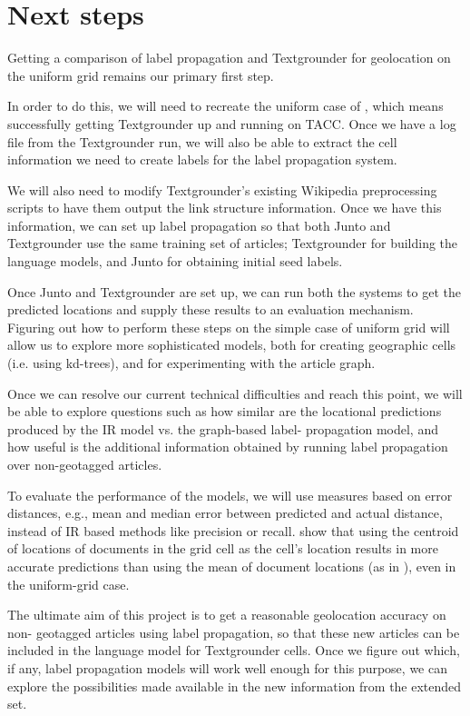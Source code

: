 \section{Next steps} Getting a comparison of label propagation and Textgrounder
for geolocation on the uniform grid remains our primary first step. 

\par In order to do this, we will need to recreate the uniform case of
, which means successfully getting Textgrounder up and
running on TACC. Once we have a log file from the Textgrounder run, we will also
be able to extract the cell information we need to create labels for the label
propagation system.  

\par  We will also need to modify Textgrounder's existing Wikipedia
preprocessing scripts to have them output the link structure information. Once
we have this information, we can set up label propagation so that both Junto
and Textgrounder use the same training set of articles; Textgrounder for
building the language models, and Junto for obtaining initial seed labels.

\par Once Junto and Textgrounder are set up, we can run both the systems to
get the predicted locations and supply these results to an evaluation
mechanism. Figuring out how to perform these steps on the simple case of
uniform grid will allow us to explore more sophisticated models, both for
creating geographic cells (i.e. using kd-trees), and for experimenting with
the article graph. 

\par Once we can resolve our current technical difficulties
and reach this point, we will be able to explore questions such as how similar
are the locational predictions produced by the IR model vs. the graph-based
label- propagation model, and how useful is the additional information
obtained by running label propagation over non-geotagged articles. 

\par To evaluate the performance of the models, we will use measures based on
error distances, e.g., mean and median error between predicted and actual
distance, instead of IR based methods like precision or recall.
 show that using the centroid of locations of documents in
the grid cell as the cell's location results in more accurate predictions than
using the mean of document locations (as in ), even in
the uniform-grid case.

\par The ultimate aim of this project is to get a reasonable geolocation
accuracy on non- geotagged articles using label propagation, so that these new
articles can be included in the language model for Textgrounder cells. Once we
figure out which, if any, label propagation models will work well enough for
this purpose, we can explore the possibilities made available in the new
information from the extended set.
